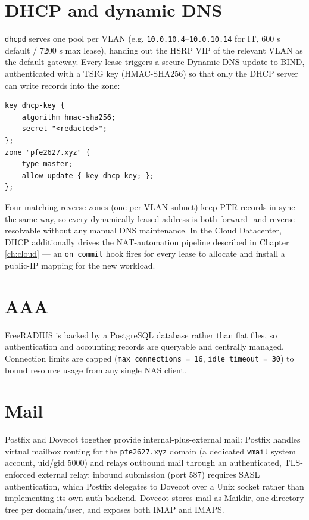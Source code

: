 \documentclass[11pt,a4paper]{report}
\begin{document}
\section{DHCP and dynamic DNS}

\texttt{dhcpd} serves one pool per VLAN (e.g. \texttt{10.0.10.4}--\texttt{10.0.10.14}
for IT, 600 s default / 7200 s max lease), handing out the HSRP VIP of the
relevant VLAN as the default gateway. Every lease triggers a secure Dynamic
DNS update to BIND, authenticated with a TSIG key (HMAC-SHA256) so that
only the DHCP server can write records into the zone:

\begin{lstlisting}
key dhcp-key {
    algorithm hmac-sha256;
    secret "<redacted>";
};
zone "pfe2627.xyz" {
    type master;
    allow-update { key dhcp-key; };
};
\end{lstlisting}

Four matching reverse zones (one per VLAN subnet) keep PTR records in sync
the same way, so every dynamically leased address is both forward- and
reverse-resolvable without any manual DNS maintenance. In the Cloud
Datacenter, DHCP additionally drives the NAT-automation pipeline described
in Chapter \ref{ch:cloud} --- an \texttt{on commit} hook fires for every
lease to allocate and install a public-IP mapping for the new workload.

\section{AAA}

FreeRADIUS is backed by a PostgreSQL database rather than flat files, so
authentication and accounting records are queryable and centrally managed.
Connection limits are capped (\texttt{max\_connections = 16},
\texttt{idle\_timeout = 30}) to bound resource usage from any single NAS
client.

\section{Mail}

Postfix and Dovecot together provide internal-plus-external mail: Postfix
handles virtual mailbox routing for the \texttt{pfe2627.xyz} domain
(a dedicated \texttt{vmail} system account, uid/gid 5000) and relays
outbound mail through an authenticated, TLS-enforced external relay;
inbound submission (port 587) requires SASL authentication, which Postfix
delegates to Dovecot over a Unix socket rather than implementing its own
auth backend. Dovecot stores mail as Maildir, one directory tree per
domain/user, and exposes both IMAP and IMAPS.
\end{document}
